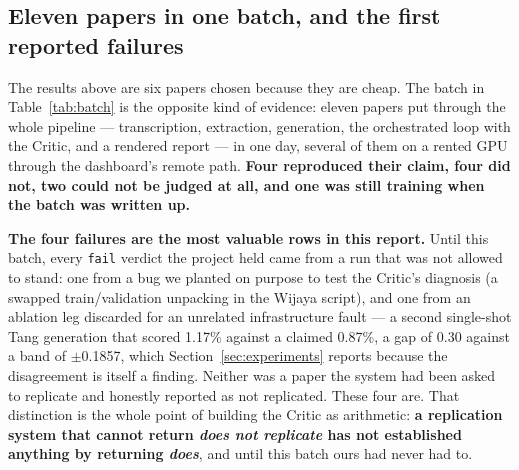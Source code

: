 \documentclass[11pt]{article}
\begin{document}
\subsection{Eleven papers in one batch, and the first reported failures}
\label{sec:batch}

The results above are six papers chosen because they are cheap. The batch in
Table~\ref{tab:batch} is the opposite kind of evidence: eleven papers put through the whole
pipeline --- transcription, extraction, generation, the orchestrated loop with the Critic, and a
rendered report --- in one day, several of them on a rented GPU through the dashboard's remote
path. \textbf{Four reproduced their claim, four did not, two could not be judged at all, and one
was still training when the batch was written up.}

\textbf{The four failures are the most valuable rows in this report.} Until this batch, every
\texttt{fail} verdict the project held came from a run that was not allowed to stand: one from a
bug we planted on purpose to test the Critic's diagnosis (a swapped train/validation unpacking
in the Wijaya script), and one from an ablation leg discarded for an unrelated infrastructure
fault --- a second single-shot Tang generation that scored 1.17\% against a claimed 0.87\%, a gap
of 0.30 against a band of $\pm$0.1857, which Section~\ref{sec:experiments} reports because the
disagreement is itself a finding. Neither was a paper the system had been asked to replicate and
honestly reported as not replicated. These four are. That distinction is the whole point of
building the Critic as arithmetic: \textbf{a replication system that cannot return
\emph{does not replicate} has not established anything by returning \emph{does}}, and until this
batch ours had never had to.
\end{document}
